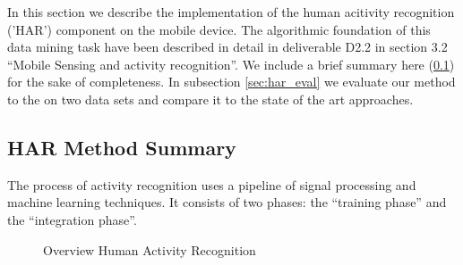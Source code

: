 
In this section we describe the implementation of the human acitivity
recognition ('HAR') component on the mobile device.  The algorithmic
foundation of this data mining task have been described in detail in
deliverable D2.2 in section 3.2 ``Mobile Sensing and activity
recognition''. We include a brief summary here (\ref{sec:har_method})
for the sake of completeness. In subsection \ref{sec:har_eval} we
evaluate our method to the on two data sets and compare it to the
state of the art approaches.

\subsection{HAR Method Summary}\label{sec:har_method}


The process of activity recognition uses a pipeline of signal
processing and machine learning techniques. It consists of two phases:
the ``training phase'' and the ``integration phase''. 

\begin{figure}[htbp]
\centering
{}
\caption{Overview Human Activity Recognition}
\end{figure}


